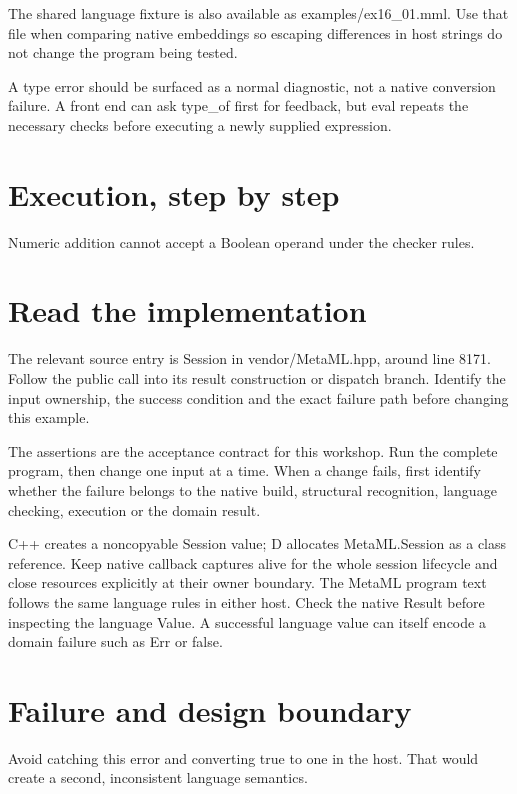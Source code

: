 The shared language fixture is also available as examples/ex16\_01.mml. Use that file when comparing native embeddings so escaping differences in host strings do not change the program being tested.

\clearpage
{}
A type error should be surfaced as a normal diagnostic, not a native conversion failure. A front end can ask type\_of first for feedback, but eval repeats the necessary checks before executing a newly supplied expression.


\section*{Execution, step by step}
Numeric addition cannot accept a Boolean operand under the checker rules.

\section*{Read the implementation}
The relevant source entry is Session in vendor/MetaML.hpp, around line 8171. Follow the public call into its result construction or dispatch branch. Identify the input ownership, the success condition and the exact failure path before changing this example.

The assertions are the acceptance contract for this workshop. Run the complete program, then change one input at a time. When a change fails, first identify whether the failure belongs to the native build, structural recognition, language checking, execution or the domain result.

\clearpage
{}
C++ creates a noncopyable Session value; D allocates MetaML.Session as a class reference. Keep native callback captures alive for the whole session lifecycle and close resources explicitly at their owner boundary. The MetaML program text follows the same language rules in either host. Check the native Result before inspecting the language Value. A successful language value can itself encode a domain failure such as Err or false.


\section*{Failure and design boundary}
Avoid catching this error and converting true to one in the host. That would create a second, inconsistent language semantics.

